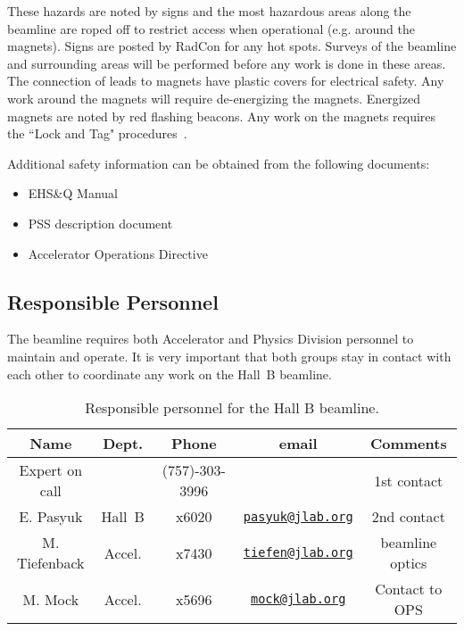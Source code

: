 These hazards are noted by signs and the most hazardous areas along the beamline are 
roped off to restrict access when operational (e.g. around the magnets). Signs are posted 
by RadCon for any hot spots. Surveys of the beamline and surrounding areas will be 
performed before any work is done in these areas. The connection of leads to magnets have 
plastic covers for electrical safety. Any work around the magnets will require 
de-energizing the magnets. Energized magnets are noted by red flashing beacons. Any work 
on the magnets requires the ``Lock and Tag" procedures~\cite{ehs}.  

Additional safety information can be obtained from the following documents:
\begin{itemize}[label=$\circ$]

\item EHS\&Q Manual~\cite{ehs} 

\item PSS description document~\cite{pss}

\item Accelerator Operations Directive~\cite{ops}

\end{itemize} 

\subsection{Responsible Personnel}

The beamline requires both Accelerator and Physics Division personnel to maintain and 
operate. It is very important that both groups stay in contact with each other to 
coordinate any work on the Hall~B beamline. 

\begin{table}[!ht]
\centering
\begin{tabular}{|c|c|c|c|c|} \hline
 Name&Dept.&Phone&email&Comments \\ \hline
Expert on call& &(757)-303-3996&& 1st contact \\ \hline
E. Pasyuk  & Hall~B&x6020&\href{mailto:pasyuk@jlab.org}{\nolinkurl{pasyuk@jlab.org}}&2nd contact \\ \hline
M. Tiefenback & Accel.&x7430&\href{mailto:tiefen@jlab.org}{\nolinkurl{tiefen@jlab.org}}& beamline optics\\ \hline
M. Mock      & Accel.&x5696&\href{mailto:mock@jlab.org}{\nolinkurl{mock@jlab.org}}&Contact to OPS \\ \hline
\end{tabular}
\caption{Responsible personnel for the Hall B beamline.} 
\label{tb:beam}
\end{table}

